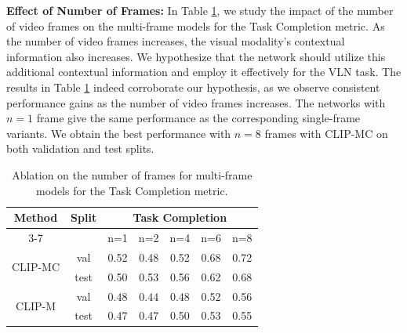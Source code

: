 \documentclass[letterpaper, 10 pt, conference]{ieeeconf}  %
\begin{document}
\textbf{Effect of Number of Frames: }In Table \ref{table:table_3}, we study the impact of the number of video frames on the multi-frame models for the Task Completion metric. As the number of video frames increases, the visual modality's contextual information also increases. We hypothesize that the network should utilize this additional contextual information and employ it effectively for the VLN task. The results in Table \ref{table:table_3} indeed corroborate our hypothesis, as we observe consistent performance gains as the number of video frames increases. The networks with $n = 1$ frame give the same performance as the corresponding single-frame variants. We obtain the best performance with $n = 8$ frames with CLIP-MC on both validation and test splits.

\begin{table}[htp]
\begin{center}
\small
\begin{tabular}{|c|c|ccccc|}
\hline
\multirow{2}{*}{Method} & \multirow{2}{*}{Split} & \multicolumn{5}{c|}{Task Completion}                                                                                 \\ \cline{3-7} 
                        &                        & \multicolumn{1}{c|}{n=1}  & \multicolumn{1}{c|}{n=2}  & \multicolumn{1}{c|}{n=4}  & \multicolumn{1}{c|}{n=6}  & n=8  \\ \hline
\multirow{2}{*}{CLIP-MC} & val & \multicolumn{1}{c|}{0.52} & \multicolumn{1}{c|}{0.48} & \multicolumn{1}{c|}{0.52} & \multicolumn{1}{c|}{0.68} & 0.72 \\ \cline{2-7} 
                        & test                   & \multicolumn{1}{c|}{0.50} & \multicolumn{1}{c|}{0.53} & \multicolumn{1}{c|}{0.56} & \multicolumn{1}{c|}{0.62} & 0.68 \\ \hline
\multirow{2}{*}{CLIP-M}  & val & \multicolumn{1}{c|}{0.48} & \multicolumn{1}{c|}{0.44}     & \multicolumn{1}{c|}{0.48}     & \multicolumn{1}{c|}{0.52} & 0.56 \\ \cline{2-7} 
                        & test                   & \multicolumn{1}{c|}{0.47} & \multicolumn{1}{c|}{0.47}     & \multicolumn{1}{c|}{0.50}     & \multicolumn{1}{c|}{0.53} & 0.55 \\ \hline
\end{tabular}%
\end{center}
\caption{Ablation on the number of frames for multi-frame models for the Task Completion metric.}
\label{table:table_3}
\end{table}
\vspace{-1em}
\end{document}
